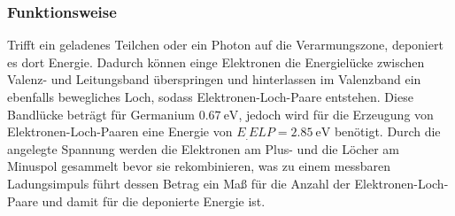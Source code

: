 \subsubsection{Funktionsweise}

Trifft ein geladenes Teilchen oder ein Photon auf die Verarmungszone, deponiert es dort Energie. Dadurch können einge Elektronen die Energielücke zwischen Valenz- und Leitungsband überspringen und hinterlassen im Valenzband ein ebenfalls bewegliches Loch, sodass Elektronen-Loch-Paare entstehen. Diese Bandlücke beträgt für Germanium $\SI{0,67}{\electronvolt}$, jedoch wird für die Erzeugung von Elektronen-Loch-Paaren eine Energie von $E_.{ELP}=\SI{2,85}{\electronvolt}$\cite{Spektrum18} benötigt. Durch die angelegte Spannung werden die Elektronen am Plus- und die Löcher am Minuspol gesammelt bevor sie rekombinieren, was zu einem messbaren Ladungsimpuls führt dessen Betrag ein Maß für die Anzahl der Elektronen-Loch-Paare und damit für die deponierte Energie ist.


